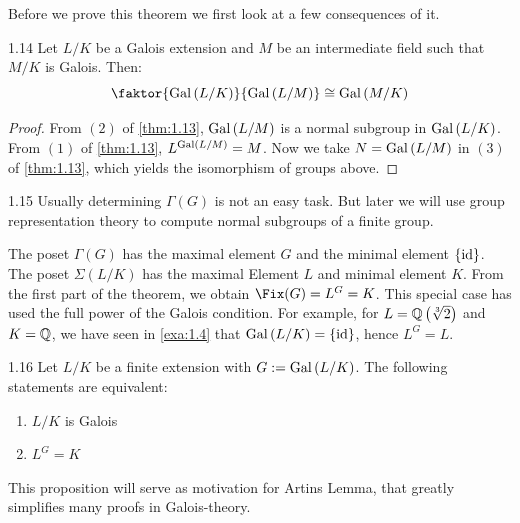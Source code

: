 \documentclass[twoside = false,	%
		headsepline,		%
		parskip = true,
		]{scrbook}						%
\begin{document}
        Before we prove this theorem we first look at a few consequences of it.
        
        \begin{corollary}{}{1.14}
            Let $L/K$ be a Galois extension and $M$ be an intermediate field such that $M/K$ is Galois. Then:
            \begin{equation*}
                \faktor{\Gal{L/K}}{\Gal{L/M}} \cong \Gal{M/K}
            \end{equation*}
        \end{corollary}
        
        \begin{proof}
            From $(2)$ of \ref{thm:1.13}, $\mathrm{Gal}\left( L/M\right)$ is a normal subgroup in $\mathrm{Gal}\left( L/K\right)$.\\ From $(1)$ of \ref{thm:1.13}, $L^{\mathrm{Gal}\left( L/M\right)} = M$. Now we take $N = \mathrm{Gal}\left( L/M\right)$ in $(3)$ of \ref{thm:1.13}, which yields the isomorphism of groups above.
        \end{proof}
        
        \begin{remark}{}{1.15}
            Usually determining $\Gamma(G)$ is not an easy task. But later we will use group representation theory to compute normal subgroups of a finite group.
        \end{remark}
        
        The poset $\Gamma(G)$ has the maximal element $G$ and the minimal element $\left\{ \mathrm{id}\right\}$. The poset $\Sigma(L/K)$ has the maximal Element $L$ and minimal element $K$. From the first part of the theorem, we obtain $\Fix(G)=L^G=K$. This special case has used the full power of the Galois condition. For example, for $L=\mathbb Q\left( \sqrt[3]2\right)$ and $K=\mathbb Q$, we have seen in \ref{exa:1.4} that $\mathrm{Gal}\left( L/K\right)=\left\{ \mathrm{id}\right\}$, hence $L^G=L$.


        \begin{proposition}{}{1.16}
            Let $L/K$ be a finite extension with $G:=\mathrm{Gal}\left( L/K\right)$. The following statements are equivalent:
            \begin{enumerate}
                \item $L/K$ is Galois
                \item $L^G=K$
            \end{enumerate}
        \end{proposition}

        This proposition will serve as motivation for Artins Lemma, that greatly simplifies many proofs in Galois-theory. 
        
\end{document}
